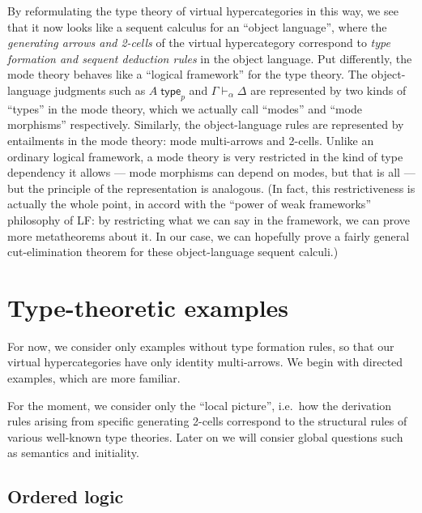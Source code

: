 \documentclass{article}
\theoremstyle{definition}
\theoremstyle{remark}
\def\type{\;\mathsf{type}}
\let\types\vdash
\begin{document}
By reformulating the type theory of virtual hypercategories in this way, we see that it now looks like a sequent calculus for an ``object language'', where the \emph{generating arrows and 2-cells} of the virtual hypercategory correspond to \emph{type formation and sequent deduction rules} in the object language.
Put differently, the mode theory behaves like a ``logical framework'' for the type theory.
The object-language judgments such as $A\type_p$ and $\Gamma\types_\alpha \Delta$ are represented by two kinds of ``types'' in the mode theory, which we actually call ``modes'' and ``mode morphisms'' respectively.
Similarly, the object-language rules are represented by entailments in the mode theory: mode multi-arrows and 2-cells.
Unlike an ordinary logical framework, a mode theory is very restricted in the kind of type dependency it allows --- mode morphisms can depend on modes, but that is all --- but the principle of the representation is analogous.
(In fact, this restrictiveness is actually the whole point, in accord with the ``power of weak frameworks'' philosophy of LF: by restricting what we can say in the framework, we can prove more metatheorems about it.
In our case, we can hopefully prove a fairly general cut-elimination theorem for these object-language sequent calculi.)


\section{Type-theoretic examples}
\label{sec:examples}

For now, we consider only examples without type formation rules, so that our virtual hypercategories have only identity multi-arrows.
We begin with directed examples, which are more familiar.

For the moment, we consider only the ``local picture'', i.e.\ how the derivation rules arising from specific generating 2-cells correspond to the structural rules of various well-known type theories.
Later on we will consier global questions such as semantics and initiality.


\subsection{Ordered logic}
\label{sec:ordered-logic}
\end{document}

